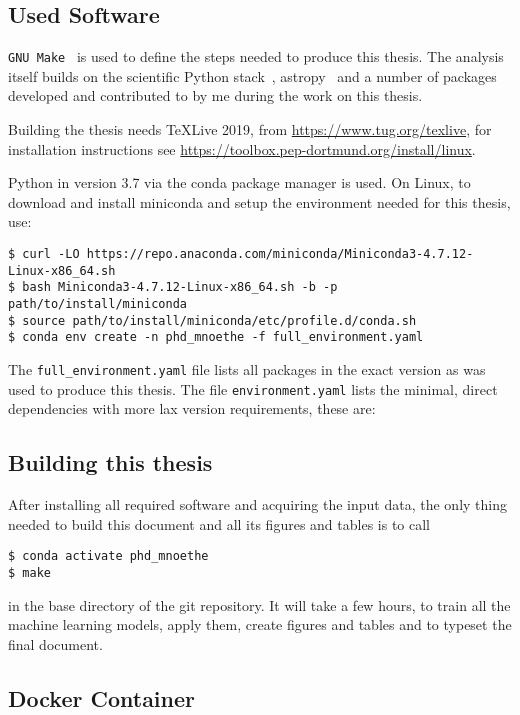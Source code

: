 \subsection{Used Software}

\texttt{GNU Make}~\cite{make} is used to define the steps needed
to produce this thesis. 
The analysis itself builds on the
scientific Python stack~\cite{numpy,scipy,pandas,matplotlib,scikit-learn},
astropy~\cite{astropy} and a number of packages developed and contributed
to by me during the work on this thesis.

Building the thesis needs TeXLive 2019, from \url{https://www.tug.org/texlive},
for installation instructions see \url{https://toolbox.pep-dortmund.org/install/linux}.

Python in version 3.7 via the conda package manager is used.
On Linux, to download and install miniconda and setup the environment needed
for this thesis, use:

\begin{lstlisting}
$ curl -LO https://repo.anaconda.com/miniconda/Miniconda3-4.7.12-Linux-x86_64.sh
$ bash Miniconda3-4.7.12-Linux-x86_64.sh -b -p path/to/install/miniconda
$ source path/to/install/miniconda/etc/profile.d/conda.sh
$ conda env create -n phd_mnoethe -f full_environment.yaml
\end{lstlisting}
The \texttt{full\_environment.yaml} file lists all packages in the exact
version as was used to produce this thesis.
The file \texttt{environment.yaml} lists the minimal, direct dependencies 
with more lax version requirements, these are:


\subsection{Building this thesis}

After installing all required software and acquiring the input data,
the only thing needed to build this document and all its figures and tables
is to call
\begin{lstlisting}
$ conda activate phd_mnoethe
$ make
\end{lstlisting}
in the base directory of the git repository.
It will take a few hours, to train all the machine learning models,
apply them, create figures and tables and to typeset the final document.

\subsection{Docker Container}

